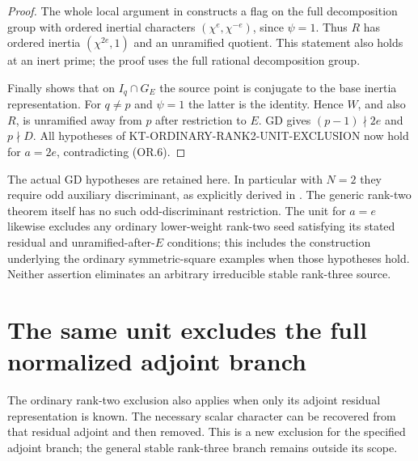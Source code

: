 \documentclass[11pt,a4paper]{article}
\theoremstyle{definition}
\begin{document}
\begin{proof}
The whole local argument in
constructs a flag on the full decomposition group
with ordered inertial characters
$(\chi^e,\chi^{-e})$, since $\psi=1$.
Thus $R$ has ordered inertia $(\chi^{2e},1)$
and an unramified quotient.  This statement
also holds at an inert prime; the proof uses
the full rational decomposition group.

Finally 
shows that on $I_q\cap G_E$ the source point is
conjugate to the base inertia representation.
For $q\ne p$ and $\psi=1$ the latter is the
identity.  Hence $W$, and also $R$, is
unramified away from $p$ after restriction to
$E$.  GD gives $(p-1)\nmid2e$ and $p\nmid D$.
All hypotheses of
KT-ORDINARY-RANK2-UNIT-EXCLUSION now hold for
$a=2e$, contradicting (OR.6).
\end{proof}

The actual GD hypotheses are retained here.  In
particular with $N=2$ they require odd auxiliary
discriminant, as explicitly derived in
.
The generic rank-two theorem itself has no such
odd-discriminant restriction.  The unit for $a=e$
likewise excludes any ordinary lower-weight
rank-two seed satisfying its stated residual
and unramified-after-$E$ conditions; this includes
the construction underlying the ordinary
symmetric-square examples when those hypotheses
hold.  Neither assertion eliminates an arbitrary
irreducible stable rank-three source.



\section{The same unit excludes the full normalized adjoint branch}
\label{sec:kt-adjoint-unit-exclusion}

The ordinary rank-two exclusion also applies when
only its adjoint residual representation is known.
The necessary scalar character can be recovered
from that residual adjoint and then removed.  This
is a new exclusion for the specified adjoint
branch; the general stable rank-three branch
remains outside its scope.
\end{document}
